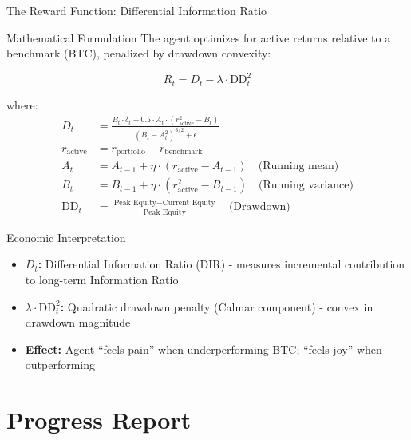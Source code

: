 \documentclass[aspectratio=169]{beamer}
\begin{document}
\begin{frame}{The Reward Function: Differential Information Ratio}
\begin{block}{Mathematical Formulation}
The agent optimizes for \alert{active returns} relative to a benchmark (BTC), penalized by \alert{drawdown convexity}:

\begin{equation}
R_t = D_t - \lambda \cdot \text{DD}_t^2
\end{equation}

where:
\begin{align}
D_t &= \frac{B_t \cdot \delta_t - 0.5 \cdot A_t \cdot (r_{\text{active}}^2 - B_t)}{(B_t - A_t^2)^{3/2} + \epsilon} \label{eq:dir} \\
r_{\text{active}} &= r_{\text{portfolio}} - r_{\text{benchmark}} \\
A_t &= A_{t-1} + \eta \cdot (r_{\text{active}} - A_{t-1}) \quad \text{(Running mean)} \\
B_t &= B_{t-1} + \eta \cdot (r_{\text{active}}^2 - B_{t-1}) \quad \text{(Running variance)} \\
\text{DD}_t &= \frac{\text{Peak Equity} - \text{Current Equity}}{\text{Peak Equity}} \quad \text{(Drawdown)}
\end{align}
\end{block}

\vspace{0.3cm}

\begin{block}{Economic Interpretation}
\begin{itemize}
    \item \textbf{$D_t$:} Differential Information Ratio (DIR) - measures incremental contribution to long-term Information Ratio
    \item \textbf{$\lambda \cdot \text{DD}_t^2$:} Quadratic drawdown penalty (Calmar component) - \alert{convex} in drawdown magnitude
    \item \textbf{Effect:} Agent ``feels pain'' when underperforming BTC; ``feels joy'' when outperforming
\end{itemize}
\end{block}
\end{frame}


\section{Progress Report}
\end{document}
